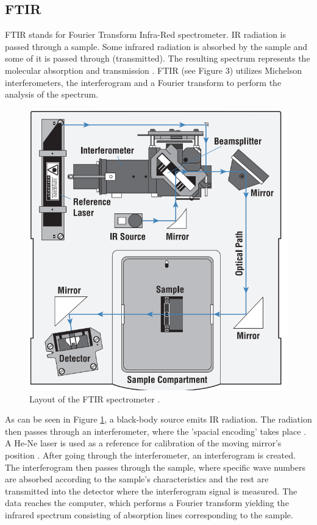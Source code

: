 \documentclass[reprint,amsmath,amssymb,aps, prl,superscriptaddress]{revtex4-2}
\begin{document}
\subsection{FTIR}
FTIR stands for Fourier Transform Infra-Red spectrometer.
IR radiation is passed through a sample.
Some
infrared radiation is absorbed by the sample and some of it is
passed through (transmitted). The resulting spectrum represents the molecular
absorption and transmission \cite{FTIRmanual}. FTIR (see Figure 3) utilizes Michelson interferometers, the interferogram and a Fourier transform to perform the analysis of the spectrum. 
\begin{figure}[H]
    \includegraphics[width=\linewidth]{Images/FTIR LAYOUT.png}
    \caption{Layout of the FTIR spectrometer \cite{FTIRmanual}.}
    \label{fig:FTIR}
    \centering
\end{figure}

As can be seen in Figure \ref{fig:FTIR}, a black-body source emits IR radiation. The radiation then passes through an interferometer, where the 'spacial encoding' takes place \cite{FTIRmanual}. A He-Ne laser is used as a reference for calibration of the moving mirror's position \cite{stuart}. After going through the interferometer, an interferogram is created. The interferogram then passes through the sample, where specific wave numbers are absorbed according to the sample's characteristics and the rest are transmitted into the detector where the interferogram signal is measured. The data reaches the computer, which performs a Fourier transform yielding the infrared spectrum consisting of absorption lines corresponding to the sample. 
\end{document}
